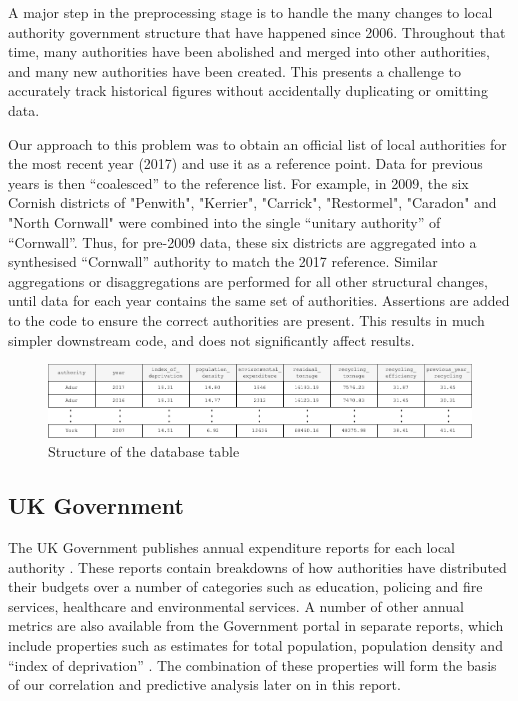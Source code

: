 \documentclass[11pt,conference]{IEEEtran}
\begin{document}
A major step in the preprocessing stage is to handle the many changes to local authority government structure that have happened since 2006. Throughout that time, many authorities have been abolished and merged into other authorities, and many new authorities have been created. This presents a challenge to accurately track historical figures without accidentally duplicating or omitting data. 

Our approach to this problem was to obtain an official list of local authorities for the most recent year (2017) and use it as a reference point. Data for previous years is then “coalesced” to the reference list. For example, in 2009, the six Cornish districts of "Penwith", "Kerrier", "Carrick", "Restormel", "Caradon" and  "North Cornwall" were combined into the single “unitary authority” of “Cornwall”. Thus, for pre-2009 data, these six districts are aggregated into a synthesised “Cornwall” authority to match the 2017 reference. Similar aggregations or disaggregations are performed for all other structural changes, until data for each year contains the same set of authorities. Assertions are added to the code to ensure the correct authorities are present. This results in much simpler downstream code, and does not significantly affect results.

\begin{figure}[htbp]
    \begin{center}
        \includegraphics[width=\linewidth]{figures/db_structure.png}
    \caption{Structure of the database table}
    \label{fig:db_structure}
    \end{center}
\end{figure}

\subsection{UK Government}
The UK Government publishes annual expenditure reports for each local authority \cite{UKGovernment2019}. These reports contain breakdowns of how authorities have distributed their budgets over a number of categories such as education, policing and fire services, healthcare and environmental services. A number of other annual metrics are also available from the Government portal in separate reports, which include properties such as estimates for total population, population density and “index of deprivation” \cite{ocsi}. The combination of these properties will form the basis of our correlation and predictive analysis later on in this report.
\end{document}
